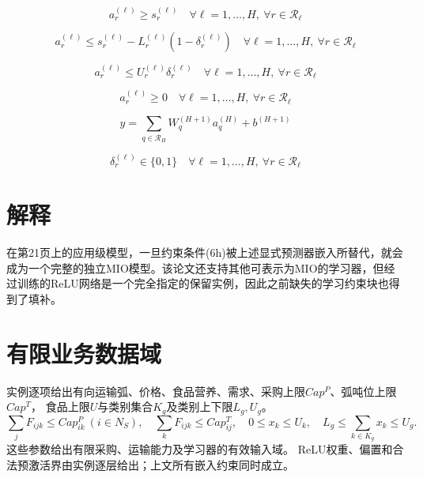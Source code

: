 \documentclass[11pt]{ctexart}
\begin{document}
\begin{equation}
a_r^{(\ell)} \ge s_r^{(\ell)}
\quad \forall \ell=1,\dots,H,\ \forall r \in \mathcal R_\ell
\tag{Emb-c}
\end{equation}

\begin{equation}
a_r^{(\ell)} \le s_r^{(\ell)} - L_r^{(\ell)} \left(1-\delta_r^{(\ell)}\right)
\quad \forall \ell=1,\dots,H,\ \forall r \in \mathcal R_\ell
\tag{Emb-d}
\end{equation}

\begin{equation}
a_r^{(\ell)} \le U_r^{(\ell)} \delta_r^{(\ell)}
\quad \forall \ell=1,\dots,H,\ \forall r \in \mathcal R_\ell
\tag{Emb-e}
\end{equation}

\begin{equation}
a_r^{(\ell)} \ge 0
\quad \forall \ell=1,\dots,H,\ \forall r \in \mathcal R_\ell
\tag{Emb-f}
\end{equation}

\begin{equation}
y =
\sum_{q \in \mathcal R_H} W_q^{(H+1)} a_q^{(H)} + b^{(H+1)}
\tag{Emb-g}
\end{equation}

\begin{equation}
\delta_r^{(\ell)} \in \{0,1\}
\quad \forall \ell=1,\dots,H,\ \forall r \in \mathcal R_\ell
\tag{Emb-h}
\end{equation}

\section*{解释}
在第21页上的应用级模型，一旦约束条件(6h)被上述显式预测器嵌入所替代，就会成为一个完整的独立MIO模型。该论文还支持其他可表示为MIO的学习器，但经过训练的ReLU网络是一个完全指定的保留实例，因此之前缺失的学习约束块也得到了填补。



\section*{有限业务数据域}
实例逐项给出有向运输弧、价格、食品营养、需求、采购上限$Cap^P$、弧吨位上限$Cap^T$，
食品上限$U$与类别集合$K_g$及类别上下限$L_g,U_g$。
\[
\sum_jF_{ijk}\le Cap^P_{ik}\ (i\in N_S),\quad
\sum_kF_{ijk}\le Cap^T_{ij},\quad0\le x_k\le U_k,\quad
L_g\le\sum_{k\in K_g}x_k\le U_g.
\]
这些参数给出有限采购、运输能力及学习器的有效输入域。
ReLU权重、偏置和合法预激活界由实例逐层给出；上文所有嵌入约束同时成立。
\end{document}
